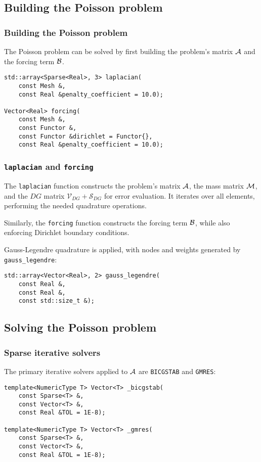 \subsection{Building the Poisson problem}

\begin{frame}[fragile]
    \frametitle{Building the Poisson problem}

    The Poisson problem can be solved by first building the problem's matrix $\mathcal{A}$ and the forcing term $\mathcal{B}$.

\begin{lstlisting}[style=cpp]
std::array<Sparse<Real>, 3> laplacian(
    const Mesh &, 
    const Real &penalty_coefficient = 10.0);

Vector<Real> forcing(
    const Mesh &, 
    const Functor &, 
    const Functor &dirichlet = Functor{}, 
    const Real &penalty_coefficient = 10.0);
\end{lstlisting}
\end{frame}

\begin{frame}[fragile]
    \frametitle{\lstinline{laplacian} and \lstinline{forcing}}

    The \lstinline{laplacian} function constructs the problem's matrix $\mathcal{A}$, the mass matrix $\mathcal{M}$, and the $DG$ matrix $\mathcal{V}_{DG} + \mathcal{S}_{DG}$ for error evaluation. It iterates over all elements, performing the needed quadrature operations.

    Similarly, the \lstinline{forcing} function constructs the forcing term $\mathcal{B}$, while also enforcing Dirichlet boundary conditions.

    Gauss-Legendre quadrature is applied, with nodes and weights generated by \lstinline{gauss_legendre}:

\begin{lstlisting}[style=cpp]
std::array<Vector<Real>, 2> gauss_legendre(
    const Real &, 
    const Real &, 
    const std::size_t &);
\end{lstlisting}
\end{frame}

\subsection{Solving the Poisson problem}

\begin{frame}[fragile]
    \frametitle{Sparse iterative solvers}

    The primary iterative solvers applied to $\mathcal{A}$ are \lstinline{BICGSTAB} and \lstinline{GMRES}:

\begin{lstlisting}[style=cpp]
template<NumericType T> Vector<T> _bicgstab(
    const Sparse<T> &, 
    const Vector<T> &, 
    const Real &TOL = 1E-8);

template<NumericType T> Vector<T> _gmres(
    const Sparse<T> &, 
    const Vector<T> &, 
    const Real &TOL = 1E-8);
\end{lstlisting}
\end{frame}

